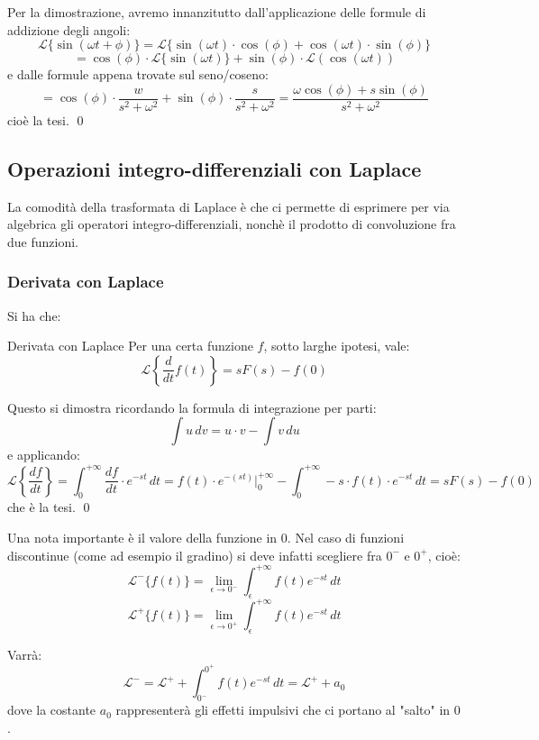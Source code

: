 \documentclass[a4paper,11pt]{article}
\begin{document}
Per la dimostrazione, avremo innanzitutto dall'applicazione delle formule di addizione degli angoli:
$$
\mathcal{L}\{\sin(\omega t + \phi)\} = \mathcal{L}\{ \sin(\omega t) \cdot \cos(\phi) + \cos(\omega t) \cdot \sin(\phi) \} 
$$
$$
= \cos(\phi) \cdot \mathcal{L} \{ \sin(\omega t) \} + \sin(\phi) \cdot \mathcal{L}(\cos (\omega t))
$$
e dalle formule appena trovate sul seno/coseno:
$$
= \cos(\phi) \cdot \frac{w}{s^2 + \omega ^2} + \sin(\phi) \cdot \frac{s}{s^2 + \omega ^2} = \frac{\omega \cos(\phi) + s \sin(\phi)}{s^2 + \omega^2}
$$
cioè la tesi. \qed

\subsection{Operazioni integro-differenziali con Laplace}
La comodità della trasformata di Laplace è che ci permette di esprimere per via algebrica gli operatori integro-differenziali, nonchè il prodotto di convoluzione fra due funzioni.

\subsubsection{Derivata con Laplace}
Si ha che:
\begin{theorem}{Derivata con Laplace}
	Per una certa funzione $f$, sotto larghe ipotesi, vale:
	$$
	\mathcal{L}\left\{ \frac{d}{dt} f(t) \right\} = s F(s) - f(0)
	$$
\end{theorem}

Questo si dimostra ricordando la formula di integrazione per parti:
$$
\int u \, dv = u \cdot v - \int v \, du
$$
e applicando:
$$
\mathcal{L}\left\{ \frac{df}{dt} \right\} = \int_0^{+\infty} \frac{df}{dt} \cdot e^{-st} \, dt = f(t) \cdot e^{-(st)} \Big|_0^{+\infty} - \int_0^{+ \infty} -s \cdot f(t) \cdot e^{-st} \, dt = s F(s) - f(0)
$$ 
che è la tesi. \qed

Una nota importante è il valore della funzione in $0$.
Nel caso di funzioni discontinue (come ad esempio il gradino) si deve infatti scegliere fra $0^-$ e $0^+$, cioè:
$$
\mathcal{L}^{-} \{f(t)\} = \lim_{\epsilon \rightarrow 0^-} \int_\epsilon^{+ \infty} f(t) e^{-st} \, dt
$$
$$
\mathcal{L}^{+} \{f(t)\} = \lim_{\epsilon \rightarrow 0^+} \int_\epsilon^{+ \infty} f(t) e^{-st} \, dt
$$

Varrà:
$$
\mathcal{L}^{-} = \mathcal{L}^{+} + \int_{0^-}^{0^+} f(t) e^{-st} \, dt = \mathcal{L}^{+} + a_0
$$
dove la costante $a_0$ rappresenterà gli effetti impulsivi che ci portano al "salto" in $0$.
\end{document}
